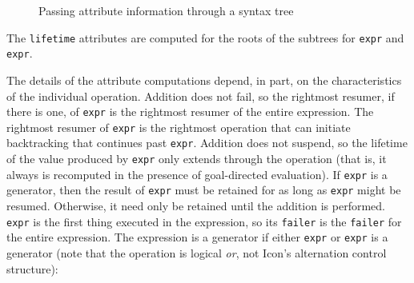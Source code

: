 \begin{figure}[htb]
\begin{center}
\end{center}
\caption{\label{p2-attInfo-SyntaxTree}%
Passing attribute information through a syntax tree}
\end{figure}

\noindent
The \texttt{lifetime} attributes are computed for the roots of the
subtrees for \texttt{expr} and
\texttt{expr}.


The details of the attribute computations depend, in part, on the
characteristics of the individual operation. Addition does not fail,
so the rightmost resumer, if there is one, of
\texttt{expr} is the rightmost resumer of the entire
expression. The rightmost resumer of \texttt{expr} is
the rightmost operation that can initiate backtracking that continues
past \texttt{expr}. Addition does not suspend, so the
lifetime of the value produced by \texttt{expr} only
extends through the operation (that is, it always is recomputed in the
presence of goal-directed evaluation). If
\texttt{expr} is a generator, then the result of
\texttt{expr} must be retained for as long as
\texttt{expr} might be resumed. Otherwise, it need
only be retained until the addition is
performed. \texttt{expr} is the first thing executed
in the expression, so its \texttt{failer} is the \texttt{failer} for
the entire expression. The expression is a generator if either
\texttt{expr} or \texttt{expr} is a
generator (note that the operation {\textbar} is logical \textit{or},
not Icon's alternation control structure):

